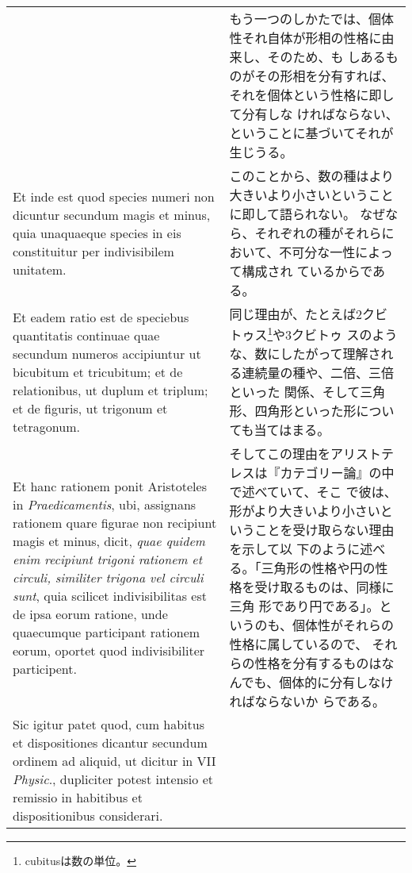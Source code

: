 \documentclass[10pt]{jsarticle} %
\begin{document}
\begin{longtable}{p{21em}p{21em}}
&

もう一つのしかたでは、個体性それ自体が形相の性格に由来し、そのため、も
しあるものがその形相を分有すれば、それを個体という性格に即して分有しな
ければならない、ということに基づいてそれが生じうる。

\\


Et inde est quod species numeri
non dicuntur secundum magis et minus, quia unaquaeque species in eis
constituitur per indivisibilem unitatem. 


&

このことから、数の種はより大きいより小さいということに即して語られない。
なぜなら、それぞれの種がそれらにおいて、不可分な一性によって構成され
ているからである。

\\


Et eadem ratio est de
speciebus quantitatis continuae quae secundum numeros accipiuntur ut
bicubitum et tricubitum; et de relationibus, ut duplum et triplum; et
de figuris, ut trigonum et tetragonum. 


&

同じ理由が、たとえば2クビトゥス\footnote{cubitusは数の単位。}や3クビトゥ
 スのような、数にしたがって理解される連続量の種や、二倍、三倍といった
 関係、そして三角形、四角形といった形についても当てはまる。

\\


Et hanc rationem ponit
Aristoteles in {\itshape Praedicamentis}, ubi, assignans rationem quare figurae
non recipiunt magis et minus, dicit, {\itshape quae quidem enim recipiunt
trigoni rationem et circuli, similiter trigona vel circuli sunt}, quia
scilicet indivisibilitas est de ipsa eorum ratione, unde quaecumque
participant rationem eorum, oportet quod indivisibiliter
participent. 


&

そしてこの理由をアリストテレスは『カテゴリー論』の中で述べていて、そこ
で彼は、形がより大きいより小さいということを受け取らない理由を示して以
下のように述べる。「三角形の性格や円の性格を受け取るものは、同様に三角
形であり円である」。というのも、個体性がそれらの性格に属しているので、
それらの性格を分有するものはなんでも、個体的に分有しなければならないか
らである。

\\


Sic igitur patet quod, cum habitus et dispositiones
dicantur secundum ordinem ad aliquid, ut dicitur in VII {\itshape Physic}.,
dupliciter potest intensio et remissio in habitibus et dispositionibus
considerari. 



\end{longtable}
\end{document}
